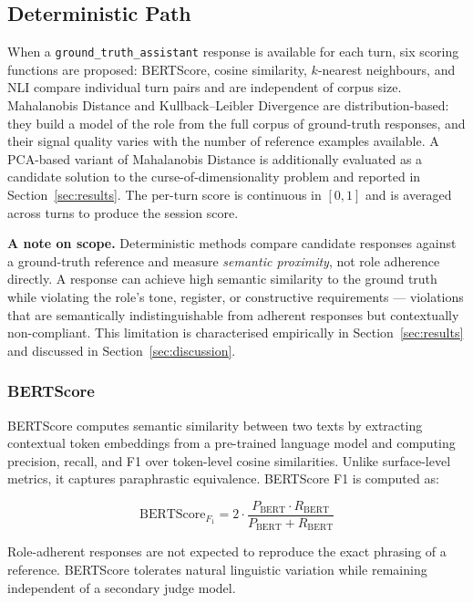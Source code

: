 \documentclass[11pt,a4paper]{article}
\begin{document}
\subsection{Deterministic Path}
\label{sec:deterministic}

When a \texttt{ground\_truth\_assistant} response is available for each turn,
six scoring functions are proposed: BERTScore, cosine similarity,
$k$-nearest neighbours, and NLI compare individual turn pairs and are
independent of corpus size. Mahalanobis Distance and Kullback--Leibler
Divergence are distribution-based: they build a model of the role from
the full corpus of ground-truth responses, and their signal quality varies
with the number of reference examples available. A PCA-based variant of
Mahalanobis Distance is additionally evaluated as a candidate solution to
the curse-of-dimensionality problem and reported in Section~\ref{sec:results}.
The per-turn score is continuous in $[0, 1]$ and is averaged across turns
to produce the session score.

\textbf{A note on scope.} Deterministic methods compare candidate responses
against a ground-truth reference and measure \emph{semantic proximity}, not
role adherence directly. A response can achieve high semantic similarity to
the ground truth while violating the role's tone, register, or constructive
requirements --- violations that are semantically indistinguishable from
adherent responses but contextually non-compliant. This limitation is
characterised empirically in Section~\ref{sec:results} and discussed in
Section~\ref{sec:discussion}.

\subsubsection{BERTScore}

BERTScore \citep{zhang2020bertscore} computes semantic similarity between two
texts by extracting contextual token embeddings from a pre-trained language
model and computing precision, recall, and F1 over token-level cosine
similarities. Unlike surface-level metrics, it captures paraphrastic equivalence.
BERTScore F1 is computed as:

\begin{equation}
  \text{BERTScore}_{F_1} = 2 \cdot \frac{P_{\text{BERT}} \cdot R_{\text{BERT}}}
  {P_{\text{BERT}} + R_{\text{BERT}}}
\end{equation}

Role-adherent responses are not expected to reproduce the exact phrasing of a
reference. BERTScore tolerates natural linguistic variation while remaining
independent of a secondary judge model.
\end{document}
